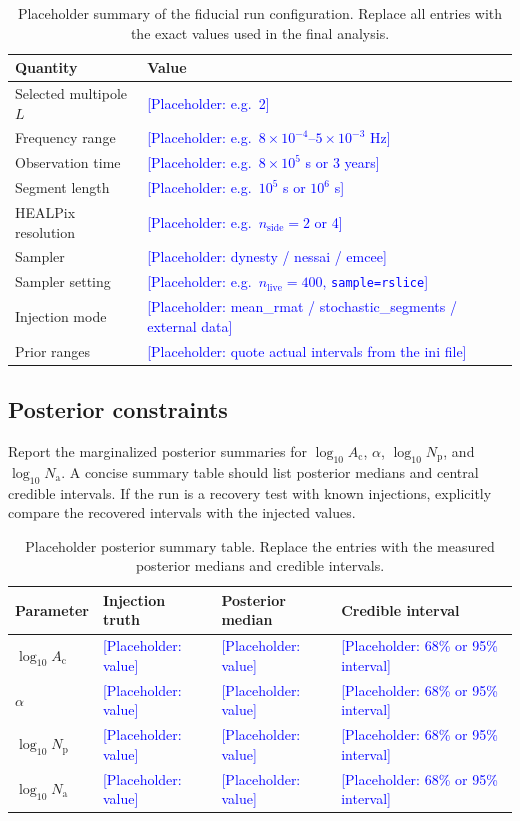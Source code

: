 \documentclass[11pt]{article}
\newcommand{\placeholder}[1]{\textcolor{blue}{[Placeholder: #1]}}
\begin{document}
\begin{table}[t]
\centering
\caption{Placeholder summary of the fiducial run configuration. Replace all entries with the exact values used in the final analysis.}
\begin{tabular}{ll}
\toprule
Quantity & Value \\
\midrule
Selected multipole $L$ & \placeholder{e.g.\ 2} \\
Frequency range & \placeholder{e.g.\ $8\times10^{-4}$--$5\times10^{-3}$ Hz} \\
Observation time & \placeholder{e.g.\ $8\times10^{5}$ s or 3 years} \\
Segment length & \placeholder{e.g.\ $10^{5}$ s or $10^{6}$ s} \\
HEALPix resolution & \placeholder{e.g.\ $n_{\mathrm{side}}=2$ or 4} \\
Sampler & \placeholder{dynesty / nessai / emcee} \\
Sampler setting & \placeholder{e.g.\ $n_{\mathrm{live}}=400$, \texttt{sample=rslice}} \\
Injection mode & \placeholder{mean\_rmat / stochastic\_segments / external data} \\
Prior ranges & \placeholder{quote actual intervals from the ini file} \\
\bottomrule
\end{tabular}
\label{tab:runconfig}
\end{table}

\subsection{Posterior constraints}

Report the marginalized posterior summaries for $\log_{10} A_{\mathrm{c}}$, $\alpha$, $\log_{10} N_{\mathrm{p}}$, and $\log_{10} N_{\mathrm{a}}$. A concise summary table should list posterior medians and central credible intervals. If the run is a recovery test with known injections, explicitly compare the recovered intervals with the injected values.

\begin{table}[t]
\centering
\caption{Placeholder posterior summary table. Replace the entries with the measured posterior medians and credible intervals.}
\begin{tabular}{llll}
\toprule
Parameter & Injection truth & Posterior median & Credible interval \\
\midrule
$\log_{10} A_{\mathrm{c}}$ & \placeholder{value} & \placeholder{value} & \placeholder{68\% or 95\% interval} \\
$\alpha$ & \placeholder{value} & \placeholder{value} & \placeholder{68\% or 95\% interval} \\
$\log_{10} N_{\mathrm{p}}$ & \placeholder{value} & \placeholder{value} & \placeholder{68\% or 95\% interval} \\
$\log_{10} N_{\mathrm{a}}$ & \placeholder{value} & \placeholder{value} & \placeholder{68\% or 95\% interval} \\
\bottomrule
\end{tabular}
\label{tab:posteriors}
\end{table}
\end{document}
